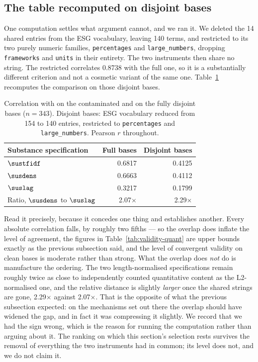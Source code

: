 \subsection{The table recomputed on disjoint bases}
\label{sec:validity-disjoint}

One computation settles what argument cannot, and we ran it. We deleted the 14 shared
entries from the ESG vocabulary, leaving 140 terms, and restricted \QUANT{} to its two
purely numeric families, \texttt{percentages} and \texttt{large\_numbers}, dropping
\texttt{frameworks} and \texttt{units} in their entirety. The two instruments then share no
string. The restricted \QUANT{} correlates 0.8738 with the full one, so it is a
substantially different criterion and not a cosmetic variant of the same one.
Table~\ref{tab:validity-disjoint} recomputes the comparison on those disjoint bases.

\begin{table}[htbp]
\centering
\caption{Correlation with \QUANT{} on the contaminated and on the fully disjoint bases
($n = 343$). Disjoint bases: ESG vocabulary reduced from 154 to 140 entries, \QUANT{}
restricted to \texttt{percentages} and \texttt{large\_numbers}. Pearson $r$ throughout.}
\label{tab:validity-disjoint}
\begin{tabular}{@{}lrr@{}}
\toprule
Substance specification & Full bases & Disjoint bases \\
\midrule
$\sustfidf$ & 0.6817 & 0.4125 \\
$\susdens$ & 0.6663 & 0.4112 \\
$\suslag$ & 0.3217 & 0.1799 \\
\addlinespace
Ratio, $\susdens$ to $\suslag$ & 2.07$\times$ & 2.29$\times$ \\
\bottomrule
\end{tabular}
\end{table}

Read it precisely, because it concedes one thing and establishes another. Every absolute
correlation falls, by roughly two fifths --- so the overlap does inflate the level of
agreement, the figures in Table~\ref{tab:validity-quant} are upper bounds exactly as the
previous subsection said, and the level of convergent validity on clean bases is moderate
rather than strong. What the overlap does \emph{not} do is manufacture the ordering. The
two length-normalised specifications remain roughly twice as close to independently counted
quantitative content as the L2-normalised one, and the relative distance is slightly
\emph{larger} once the shared strings are gone, 2.29$\times$ against 2.07$\times$. That is
the opposite of what the previous subsection expected: on the mechanisms set out there the
overlap should have widened the gap, and in fact it was compressing it slightly. We record
that we had the sign wrong, which is the reason for running the computation rather than
arguing about it. The ranking on which this section's selection rests survives the removal
of everything the two instruments had in common; its level does not, and we do not claim it.

